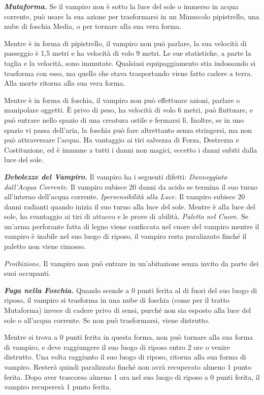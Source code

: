 \begin{multicols}{2}
\emph{\textbf{Mutaforma.}} Se il vampiro non è sotto la luce del sole o
immerso in acqua corrente, può usare la sua azione per trasformarsi in
un Minuscolo pipistrello, una nube di foschia Media, o per tornare alla
sua vera forma.

Mentre è in forma di pipistrello, il vampiro non può parlare, la sua
velocità di passeggio è 1,5 metri e ha velocità di volo 9 metri. Le sue
statistiche, a parte la taglia e la velocità, sono immutate. Qualsiasi
equipaggiamento stia indossando si trasforma con esso, ma quello che
stava trasportando viene fatto cadere a terra. Alla morte ritorna alla
sua vera forma.

Mentre è in forma di foschia, il vampiro non può effettuare azioni,
parlare o manipolare oggetti. È privo di peso, ha velocità di volo 6
metri, può fluttuare, e può entrare nello spazio di una creatura ostile
e fermarsi lì. Inoltre, se in uno spazio vi passa dell'aria, la foschia
può fare altrettanto senza stringersi, ma non può attraversare l'acqua.
Ha vantaggio ai tiri salvezza di Forza, Destrezza e Costituzione, ed è
immune a tutti i danni non magici, eccetto i danni subiti dalla luce del
sole.

\emph{\textbf{Debolezze del Vampiro.}} Il vampiro ha i seguenti difetti:
\emph{Danneggiato dall'Acqua Corrente.} Il vampiro subisce 20 danni da
acido se termina il suo turno all'interno dell'acqua corrente.
\emph{Ipersensibilità alla Luce.} Il vampiro subisce 20 danni radianti
quando inizia il suo turno alla luce del sole. Mentre è alla luce del
sole, ha svantaggio ai tiri di attacco e le prove di abilità.
\emph{Paletto nel Cuore.} Se un'arma perforante fatta di legno viene
conficcata nel cuore del vampiro mentre il vampiro è inabile nel suo
luogo di riposo, il vampiro resta paralizzato finché il paletto non
viene rimosso.

\emph{Proibizione.} Il vampiro non può entrare in un'abitazione senza
invito da parte dei suoi occupanti.

\emph{\textbf{Fuga nella Foschia.}} Quando scende a 0 punti ferita al di
fuori del suo luogo di riposo, il vampiro si trasforma in una nube di
foschia (come per il tratto Mutaforma) invece di cadere privo di sensi,
purché non sia esposto alla luce del sole o all'acqua corrente. Se non
può trasformarsi, viene distrutto.

Mentre si trova a 0 punti ferita in questa forma, non può tornare alla
sua forma di vampiro, e deve raggiungere il suo luogo di riposo entro 2
ore o venire distrutto. Una volta raggiunto il suo luogo di riposo,
ritorna alla sua forma di vampiro. Resterà quindi paralizzato finché non
avrà recuperato almeno 1 punto ferita. Dopo aver trascorso almeno 1 ora
nel suo luogo di riposo a 0 punti ferita, il vampiro recupererà 1 punto
ferita.


\end{multicols}
